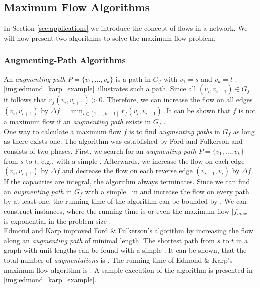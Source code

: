 
\subsection{Maximum Flow Algorithms}
\label{sec:max_flow}

In Section \ref{sec:applications} we introduce the concept of flows in a network. We
will now present two algorithms to solve the maximum flow problem.

\subsubsection{Augmenting-Path Algorithms}
\label{sec:aug_path}

An \emph{augmenting path} $P = \{v_1,\ldots,v_k\}$ is a path in $G_f$ with $v_1 = s$ and 
$v_k = t$ \cite{edmonds1972theoretical}. \autoref{img:edmond_karp_example}~illustrates such a path.
Since all $(v_i,v_{i+1}) \in G_f$ it follows that $r_f(v_i,v_{i+1}) > 0$. 
Therefore, we can increase the flow on all edges $(v_i,v_{i+1})$ by 
$\Delta f = \min_{i \in [1,\ldots,k-1]} r_f(v_i,v_{i+1})$. It can be shown that $f$ is not a
maximum flow if an \emph{augmenting path} exists in $G_f$ \cite{edmonds1972theoretical}. \\
One way to calculate a maximum flow $f$ is to find \emph{augmenting paths} in $G_f$ as
long as there exists one. The algorithm was established by Ford and Fulkerson \cite{ford1956maximal} and
consists of two phases. First, we search for an \emph{augmenting path} $P = \{v_1,\ldots,v_k\}$
from $s$ to $t$, e.g., with a simple \DFS. Afterwards, we increase the flow on each
edge $(v_i,v_{i+1})$ by $\Delta f$ and decrease the flow on each reverse edge $(v_{i+1},v_i)$
by $\Delta f$. If the capacities are integral, the algorithm always terminates. Since we can find an \emph{augmenting
path} in $G_f$ with a simple \DFS~in  and increase the
flow on every path by at least one, the running time of the algorithm can be bounded by .
We can construct instances, where the running time is  or even the maximum flow $|f_{max}|$ 
is exponential in the problem size \cite{edmonds1972theoretical}. \\
Edmond and Karp \cite{edmonds1972theoretical} improved Ford \& Fulkerson's algorithm by increasing the flow
along an \emph{augmenting path} of minimal length. The shortest path from $s$ to $t$ in a 
graph with unit lengths can be found with a simple \BFS. It can be shown, that the
total number of \emph{augmentations} is . The running time of Edmond \& Karp's
maximum flow algorithm is . A sample execution of the algorithm
is presented in \autoref{img:edmond_karp_example}.

